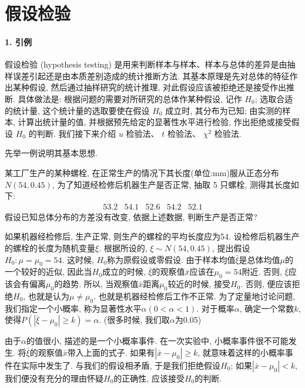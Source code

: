 \section{假设检验}

\paragraph{1. 引例}假设检验 (hypothesis testing) 是用来判断样本与样本、样本与总体的差异是由抽样误差引起还是由本质差别造成的统计推断方法. 其基本原理是先对总体的特征作出某种假设, 然后通过抽样研究的统计推理, 对此假设应该被拒绝还是接受作出推断. 具体做法是: 根据问题的需要对所研究的总体作某种假设, 记作 $H_0$; 选取合适的统计量, 这个统计量的选取要使在假设 $H_0$ 成立时, 其分布为已知; 由实测的样本, 计算出统计量的值, 并根据预先给定的显著性水平进行检验, 作出拒绝或接受假设 $H_0$ 的判断. 我们接下来介绍 $u$ 检验法、 $t$ 检验法、 $\chi^2$ 检验法.

先举一例说明其基本思想. 

\begin{example}
    某工厂生产的某种螺栓, 在正常生产的情况下其长度(单位:mm)服从正态分布 $N(54,0.45)$, 为了知道经检修后机器生产是否正常, 抽取 5 只螺栓, 测得其长度如下:
$$\begin{array}{llllll}53.2 & 54.1 & 52.6 & 54.2 & 52.1\end{array}$$
假设已知总体分布的方差没有改变, 依据上述数据, 判断生产是否正常?
\end{example}

如果机器经检修后, 生产正常, 则生产的螺栓的平均长度应为54. 设检修后机器生产的螺栓的长度为随机变量$\xi$. 根据所设的, $\xi\sim N(54, 0.45)$, 提出假设$H_0:\mu = \mu_0 = 54$. 这时候, $H_0$称为原假设或零假设. 由于样本均值$\bar\xi$是总体均值$\mu$的一个较好的近似, 因此当$H_0$成立的时候, $\bar\xi$的观察值$\bar x$应该在$\mu_0=54$附近. 否则, $\bar\xi$应该会有偏离$\mu_0$的趋势. 所以, 当观察值$\bar x$距离$\mu_0$较近的时候, 接受$H_0$. 否则, 便应该拒绝$H_0$, 也就是认为$\mu\neq \mu_0$. 也就是机器经检修后工作不正常. 为了定量地讨论问题, 我们指定一个小概率, 称为显著性水平$\alpha(0<\alpha<1)$. 对于概率$\alpha$, 确定一个常数$k$, 使得$P\left(\left|\bar{\xi}-\mu_0\right| \geq k\right)=\alpha$. (很多时候, 我们取$\alpha$为0.05)

由于$\alpha$的值很小, 描述的是一个小概率事件. 在一次实验中, 小概率事件很不可能发生. 将$\bar \xi$的观察值$\bar x$带入上面的式子. 如果有$|\bar x-\mu_0|\geq k$, 就意味着这样的小概率事件在实际中发生了. 与我们的假设相矛盾, 于是我们拒绝假设$H_0$; 如果$|\bar x - \mu_0|<k$, 我们便没有充分的理由怀疑$H_0$的正确性, 应该接受$H_0$的判断. 

